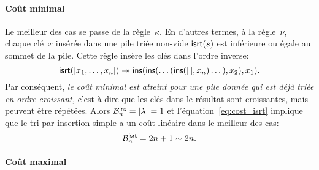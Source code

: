 \paragraph{Coût minimal}

Le meilleur des cas se passe de la règle~\(\kappa\). En d'autres
termes, à la règle~\(\nu\), chaque clé~\(x\) insérée dans une pile
triée non-vide \(\fun{isrt}(s)\) est
inférieure ou égale au sommet de la pile. Cette règle insère les clés
dans l'ordre inverse:
\begin{equation}
\fun{isrt}([x_1,\dots,x_n]) \twoheadrightarrow
\fun{ins}(\fun{ins}(\dots(\fun{ins}(\el,x_n)\dots),x_2),x_1).
\label{inv_isrt}
\end{equation}
Par conséquent, \emph{le coût minimal est atteint pour une pile donnée
  qui est déjà triée en ordre croissant,} c'est-à-dire que les clés
dans le résultat sont croissantes, mais peuvent être répétées. Alors
\(\B{\fun{ins}}{n} = \len{\lambda} = 1\)
et l'équation~\eqref{eq:cost_isrt} implique que le tri par insertion
simple a un coût linéaire dans le meilleur des cas:
\begin{equation*}
\B{\fun{isrt}}{n} = 2n+1 \sim 2n.
\end{equation*}

\paragraph{Coût maximal}


